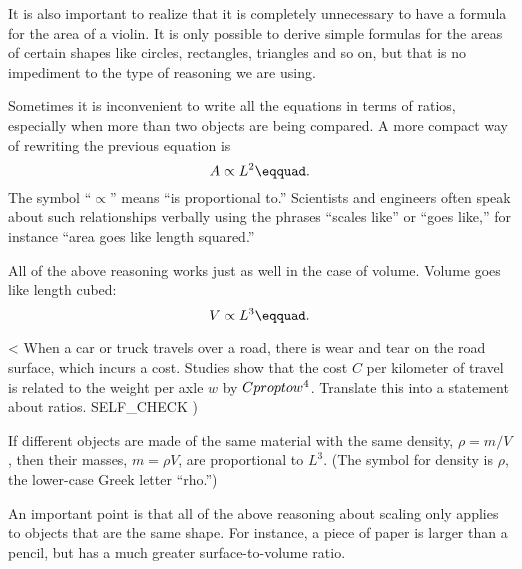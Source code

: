 It is also important to realize that it is completely
unnecessary to have a formula for the area of a violin. It
is only possible to derive simple formulas for the areas of
certain shapes like circles, rectangles, triangles and so
on, but that is no impediment to the type of reasoning we are using.

Sometimes it is inconvenient to write all the equations in
terms of ratios, especially when more than two objects are
being compared. A more compact way of rewriting the
previous equation is
\begin{equation*}
   A \propto L^2\eqquad.
\end{equation*}
The symbol ``$\propto$'' means ``is proportional to.''
Scientists and engineers often speak about such relationships
verbally using the phrases ``scales like'' or ``goes like,''
for instance ``area goes like length squared.''

All of the above reasoning works just as well in the case of
volume. Volume goes like length cubed:
\begin{equation*}
  V \propto L^3\eqquad.
\end{equation*}

<%
When a car or truck travels over a road, there is wear and tear on the road surface, which incurs a cost.
Studies show that the cost $C$ per kilometer of travel is related to the weight per axle $w$
by $C \\propto w^4$.
Translate this into a statement about ratios.
  SELF_CHECK
  ) %


If different objects are made of the same material with the
same density, $\rho =m/V$, then their masses, $m=\rho V$,
are proportional to $L^3$. (The
symbol for density is $\rho$, the lower-case Greek letter ``rho.'')

An important point is that all of the above reasoning about
scaling only applies to objects that are the same shape. For
instance, a piece of paper is larger than a pencil, but has
a much greater surface-to-volume ratio.

